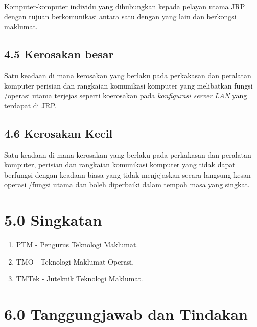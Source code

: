 \documentclass[
]{article}
\begin{document}
Komputer-komputer individu yang dihubungkan kepada pelayan utama JRP
dengan tujuan berkomunikasi antara satu dengan yang lain dan berkongsi
maklumat.

\hypertarget{kerosakan-besar}{%
\subsection{4.5 Kerosakan besar}\label{kerosakan-besar}}

Satu keadaan di mana kerosakan yang berlaku pada perkakasan dan
peralatan komputer perisian dan rangkaian komunikasi komputer yang
melibatkan fungsi /operasi utama terjejas seperti koerosakan pada
\emph{konfigurasi server} \emph{LAN} yang terdapat di JRP.

\hypertarget{kerosakan-kecil}{%
\subsection{4.6 Kerosakan Kecil}\label{kerosakan-kecil}}

Satu keadaan di mana kerosakan yang berlaku pada perkakasan dan
peralatan komputer, perisian dan rangkaian komunikasi komputer yang
tidak dapat berfungsi dengan keadaan biasa yang tidak menjejaskan secara
langsung kesan operasi /fungsi utama dan boleh diperbaiki dalam tempoh
masa yang singkat.

\hypertarget{singkatan}{%
\section{5.0 Singkatan}\label{singkatan}}

\begin{enumerate}
\def\labelenumi{\roman{enumi})}
\item
  PTM - Pengurus Teknologi Maklumat.
\item
  TMO - Teknologi Maklumat Operasi.
\item
  TMTek - Juteknik Teknologi Maklumat.
\end{enumerate}

\hypertarget{tanggungjawab-dan-tindakan}{%
\section{6.0 Tanggungjawab dan
Tindakan}\label{tanggungjawab-dan-tindakan}}
\end{document}
